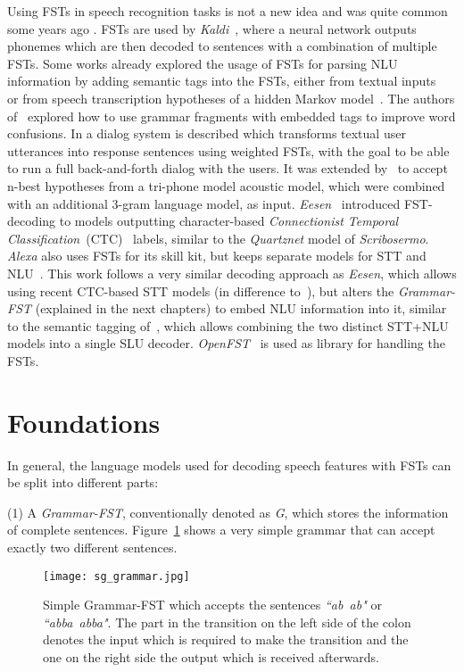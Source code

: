 \documentclass[a4paper]{article}
\begin{document}
\vspace{9pt}
Using FSTs in speech recognition tasks is not a new idea and was quite common some years ago \cite{WFSTSR, SRWFST}. FSTs are used by \textit{Kaldi}~\cite{KALDI}, where a neural network outputs phonemes which are then decoded to sentences with a combination of multiple FSTs. 
Some works already explored the usage of FSTs for parsing NLU information by adding semantic tags into the FSTs, either from textual inputs~\cite{GDASLU, HRBRNN} or from speech transcription hypotheses of a hidden Markov model~\cite{FSTSI}. The authors of~\cite{ISLUWC} explored how to use grammar fragments with embedded tags to improve word confusions. In \cite{RAWDS} a dialog system is described which transforms textual user utterances into response sentences using 
weighted FSTs, with the goal to be able to run a full back-and-forth dialog with the users. It was extended by~\cite{EXWDS} to accept n-best hypotheses from a tri-phone model acoustic model, which were combined with an additional 3-gram language model, as input.
\textit{Eesen}~\cite{EESEN} introduced FST-decoding to models outputting character-based \textit{Connectionist Temporal Classification}~(CTC)~\cite{CTCL} labels, similar to the \textit{Quartznet} model of \textit{Scribosermo}. \textit{Alexa} also uses FSTs for its skill kit, but keeps separate models for STT and NLU~\cite{JSTASK}. This work follows a very similar decoding approach as \textit{Eesen}, which allows using recent CTC-based STT models (in difference to~\cite{FSTSI,ISLUWC,EXWDS}), but alters the \textit{Grammar-FST} (explained in the next chapters) to embed NLU information into it, similar to the semantic tagging of~\cite{HRBRNN,FSTSI,ISLUWC}, which allows combining the two distinct STT+NLU models into a single SLU decoder. 
\mbox{\textit{OpenFST}}~\cite{OFST} is used as library for handling the FSTs.


\section{Foundations}
\label{sec:foundat}

In general, the language models used for decoding speech features with FSTs can be split into different parts: 

\noindent(1) A \textit{Grammar-FST}, conventionally denoted as \textit{G}, which stores the information of complete sentences. Figure~\ref{fig:sg_grammar} shows a very simple grammar that can accept exactly two different sentences.

\begin{figure}[!htbp]
	\centering
	\texttt{[image: sg\_grammar.jpg]}
	\caption{Simple Grammar-FST which accepts the sentences \textit{``ab~ab"} or \textit{``abba~abba"}. The part in the transition on the left side of the colon denotes the input which is required to make the transition and the one on the right side the output which is received afterwards.}
	\label{fig:sg_grammar}
\end{figure}
\end{document}
